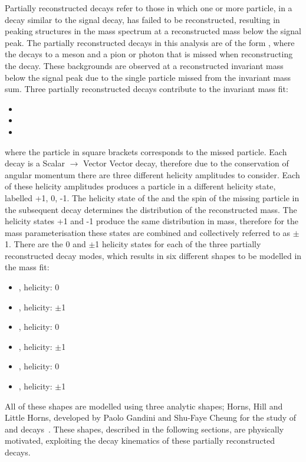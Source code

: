 Partially reconstructed decays refer to those in which one or more particle, in a \B decay similar to the signal decay, has failed to be reconstructed, resulting in peaking structures in the \B mass spectrum at a reconstructed mass below the signal peak. The partially reconstructed decays in this analysis are of the form \decay{\B}{\Dstar\Kstar}, where the \Dstar decays to a \Dz meson and a pion or photon that is missed when reconstructing the decay. These backgrounds are observed at a reconstructed invariant mass below the signal peak due to the single particle missed from the invariant mass sum. Three partially reconstructed decays contribute to the invariant mass fit:

\begin{itemize}
\item{\decay{\Bm}{(\decay{\Dstarz}{\Dz[\piz]})\Kstarm}}
\item{\decay{\Bm}{(\decay{\Dstarz}{\Dz[\gamma]})\Kstarm}}
\item{\decay{\Bd}{(\decay{\Dstarp}{\Dz[\pip]})\Kstarm}}
\end{itemize}

where the particle in square brackets corresponds to the missed particle. Each \decay{\B}{\Dstar\Kstar} decay is a Scalar $\to$ Vector Vector decay, therefore due to the conservation of angular momentum there are three different helicity amplitudes to consider. Each of these helicity amplitudes produces a \Dstar particle in a different helicity state, labelled +1, 0, -1. The helicity state of the \Dstar and the spin of the missing particle in the subsequent \Dstar decay determines the distribution of the reconstructed \B mass. The helicity states +1 and -1 produce the same distribution in \Bm mass, therefore for the mass parameterisation these states are combined and collectively referred to as $\pm$1. There are the 0 and $\pm$1 \Dstar helicity states for each of the three partially reconstructed decay modes, which results in six different shapes to be modelled in the mass fit:
\begin{itemize}
\item{\decay{\Bm}{(\decay{\Dstarz}{\Dz[\piz]})\Kstarm}, \Dstarz helicity: 0} 
\item{\decay{\Bm}{(\decay{\Dstarz}{\Dz[\piz]})\Kstarm}, \Dstarz helicity: $\pm$1} 
\item{\decay{\Bm}{(\decay{\Dstarz}{\Dz[\gamma]})\Kstarm}, \Dstarz helicity: 0}
\item{\decay{\Bm}{(\decay{\Dstarz}{\Dz[\gamma]})\Kstarm}, \Dstarz helicity: $\pm$1}
\item{\decay{\Bd}{(\decay{\Dstarp}{\Dz[\pip]})\Kstarm}, \Dstarp helicity: 0}
\item{\decay{\Bd}{(\decay{\Dstarp}{\Dz[\pip]})\Kstarm}, \Dstarp helicity: $\pm$1}
\end{itemize}
All of these shapes are modelled using three analytic shapes; Horns, Hill and Little Horns, developed by Paolo Gandini and Shu-Faye Cheung for the study of  and \decay{\Bz}{\D\Kstarz} decays~\cite{LHCb-PAPER-2017-021,LHCb-PAPER-2016-006}. These shapes, described in the following sections, are physically motivated, exploiting the decay kinematics of these partially reconstructed decays.

